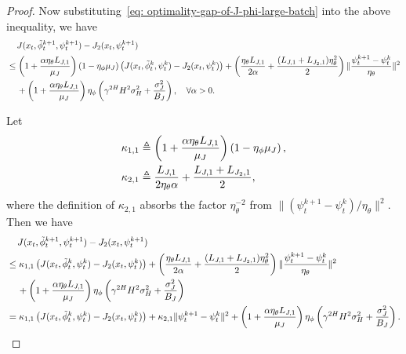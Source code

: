\documentclass{article}
\theoremstyle{plain}
\theoremstyle{definition}
\theoremstyle{remark}
\def\bydef{\triangleq}
\begin{document}
\begin{proof}
    Now substituting~\eqref{eq: optimality-gap-of-J-phi-large-batch} into the above inequality, we have
    \begin{align}
        & \quad\, J(x_t,\tilde{\phi}_t^{k+1},\psi_t^{k+1}) - J_2(x_t,\psi_t^{k+1}) \notag \\
        & \leq \left( 1 +\frac{\alpha \eta_\theta L_{J,1}}{\mu_J} \right) \left(1 - \eta_\phi \mu_J\right)  \left( J(x_t,\tilde{\phi}_t^{k},\psi_t^k) - J_2(x_t,\psi_t^k) \right) + \left( \frac{\eta_\theta L_{J,1}}{2\alpha}  + \frac{(L_{J,1} + L_{J_2,1}) \eta_\theta^2}{2} \right) \| \frac{\psi^{k+1}_t - \psi^{k}_t}{\eta_\theta}\|^2 \notag \\
        & \quad\, +\left( 1 +\frac{\alpha \eta_\theta L_{J,1}}{\mu_J} \right) \eta_\phi \left( \gamma^{2H} H^2 \sigma_H^2 + \frac{\sigma_J^2}{B_{J}} \right)     ,\quad \forall \alpha >0.
    \end{align}


    Let 
    \begin{align}
        \kappa_{1,1} &\bydef \left( 1 +\frac{\alpha \eta_\theta L_{J,1}}{\mu_J} \right)\left(1 - \eta_\phi \mu_J\right), \notag\\  
        \kappa_{2,1} &\bydef \frac{L_{J,1}}{2\eta_\theta \alpha}   + \frac{L_{J,1} + L_{J_2,1}}{2}, \notag
    \end{align}
    where the definition of $\kappa_{2,1}$ absorbs the factor $\eta_\theta^{-2}$ from $\|(\psi_t^{k+1}-\psi_t^k)/\eta_\theta\|^2$.
    Then we have
    \begin{align}
         & \quad \, J(x_t,\tilde{\phi}_t^{k+1},\psi_t^{k+1}) - J_2(x_t,\psi_t^{k+1}) \notag \\
         & \leq \kappa_{1,1} \left( J(x_t,\tilde{\phi}_t^{k},\psi_t^{k}) - J_2(x_t,\psi_t^{k}) \right) +  \left( \frac{\eta_\theta L_{J,1}}{2\alpha}  + \frac{ (L_{J,1} + L_{J_2,1}) \eta_\theta^2}{2} \right)\| \frac{\psi^{k+1}_t - \psi^{k}_t}{\eta_\theta}\|^2 \notag \\
         & \quad \, +\left( 1 +\frac{\alpha \eta_\theta L_{J,1}}{\mu_J} \right) \eta_\phi \left( \gamma^{2H} H^2 \sigma_H^2 + \frac{\sigma_J^2}{B_{J}} \right) \notag\\
         & = \kappa_{1,1} \left( J(x_t,\tilde{\phi}_t^{k},\psi_t^{k}) - J_2(x_t,\psi_t^{k}) \right)  + \kappa_{2,1} \| \psi^{k+1}_t - \psi^{k}_t\|^2 +\left( 1 +\frac{\alpha \eta_\theta L_{J,1}}{\mu_J} \right) \eta_\phi \left( \gamma^{2H} H^2 \sigma_H^2 + \frac{\sigma_J^2}{B_{J}} \right).
    \end{align}


\end{proof}
\end{document}

